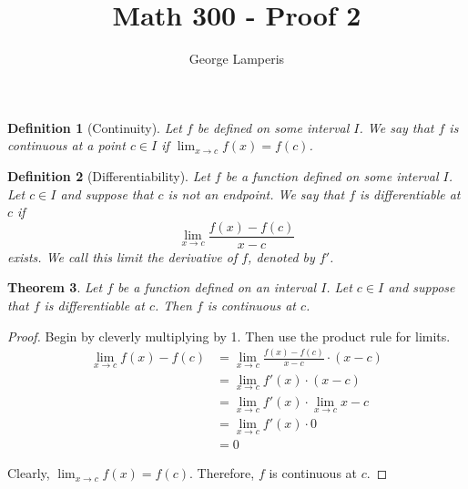 \documentclass[12pt]{article}
\title{Math 300 - Proof 2}
\author{George Lamperis}
\date{}
\theoremstyle{mystyle}
\newtheorem{thm}{Theorem}
\newtheorem{defn}[thm]{Definition}
\begin{document}
\maketitle

\begin{defn}[Continuity]
  Let $f$ be defined on some interval $I$. We say that $f$ is continuous at a
  point $c \in I$ if $\lim_{x \to c} f(x) = f(c)$.
\end{defn}


\begin{defn}[Differentiability]
  Let $f$ be a function defined on some interval $I$. Let $c \in I$ and
  suppose that $c$ is not an endpoint. We say that $f$ is differentiable at $c$
  if 
  $$ \lim_{x \to c} \frac{f(x)-f(c)}{x-c}$$
  exists. We call this limit the derivative of $f$, denoted by $f'$.
\end{defn}


\begin{thm}
  Let $f$ be a function defined on an interval $I$. Let $c \in I$ and suppose
  that $f$ is differentiable at $c$. Then $f$ is continuous at $c$. 
\end{thm}
\begin{proof}
  Begin by cleverly multiplying by 1. Then use the product rule for limits.
  \begin{align*}
    \lim_{x \to c} f(x)-f(c) &= \lim_{x \to c} \frac{f(x)-f(c)}{x-c} \cdot (x-c) \\
                             &= \lim_{x \to c} f'(x) \cdot (x-c) \\   
                             &= \lim_{x \to c} f'(x) \cdot \lim_{x \to c} x-c \\   
                             &= \lim_{x \to c} f'(x) \cdot 0 \\   
                             &= 0
  \end{align*}
  
  Clearly, $\lim_{x \to c} f(x) = f(c)$. Therefore, $f$ is continuous at $c$.
\end{proof}
\end{document}
